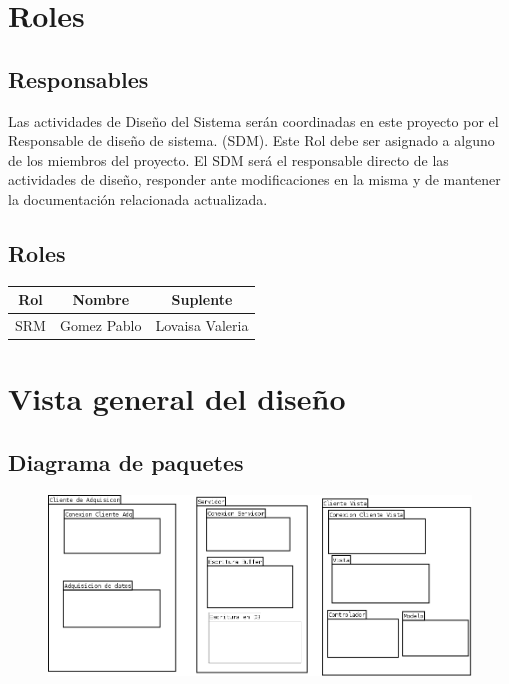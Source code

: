 \newpage
\section{\textcolor[gray]{.2}{Roles}}
\subsection{\textcolor[gray]{.2}{Responsables}}

Las actividades de Diseño del Sistema serán coordinadas en este proyecto por el Responsable de diseño de sistema. (SDM). Este Rol debe ser asignado a alguno de los miembros del proyecto.
El SDM será el responsable directo de las actividades de diseño, responder ante modificaciones en la misma  y de mantener la documentación relacionada actualizada.


\subsection{\textcolor[gray]{.2}{Roles}}
\begin{table}[!h]
\begin{center}
\begin{tabular}{|c|c|c|}
\hline
\rowcolor[gray]{.8} Rol & Nombre & Suplente\\
\hline
SRM & Gomez Pablo & Lovaisa Valeria\\
\hline
\end{tabular}
\end{center}
\end{table}

\newpage
\section{\textcolor[gray]{.2}{Vista general del diseño}}
\subsection{\textcolor[gray]{.2}{Diagrama de paquetes}}
\begin{figure}[h!]
 \begin{center}
  \includegraphics[width=1\textwidth,keepaspectratio=true]{img/diagrama_paquetes.png}
  \label{fig:esquema}
 \end{center}
\end{figure}



